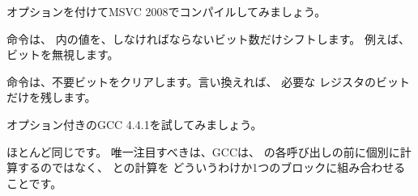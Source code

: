 
\Ox オプションを付けてMSVC 2008でコンパイルしてみましょう。




命令は、 \EAX 内の値を、しなければならないビット数だけシフトします。
例えば、ビットを無視します。


\AND 命令は、不要ビットをクリアします。言い換えれば、
必要な \EAX レジスタのビットだけを残します。




\Othree オプション付きのGCC 4.4.1を試してみましょう。



ほとんど同じです。 
唯一注目すべきは、GCCは、 \printf の各呼び出しの前に個別に計算するのではなく、
との計算を
どういうわけか1つのブロックに組み合わせることです。
